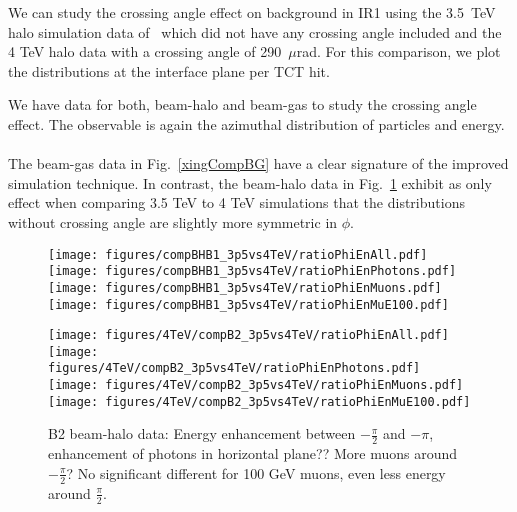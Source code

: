 We can study the crossing angle effect on background in IR1 using the 3.5~TeV halo simulation data of~\cite{nimPaperRod} which did not have any crossing angle included and the 4 TeV halo data with a crossing angle of 290~$\mu$rad. For this comparison, we plot the distributions at the interface plane per TCT hit. 

We have data for both, beam-halo and beam-gas to study the crossing angle effect. The observable is again the azimuthal distribution of particles and energy.\\

{\\} The beam-gas data in Fig.~\ref{xingCompBG} have a clear signature of the improved simulation technique. In contrast, the beam-halo data in Fig.~\ref{xingCompBH} exhibit as only effect when comparing 3.5 TeV to 4 TeV simulations that the distributions without crossing angle are slightly more symmetric in $\phi$. 

\begin{figure}
\begin{center}
  \texttt{[image: figures/compBHB1\_3p5vs4TeV/ratioPhiEnAll.pdf]}
  \texttt{[image: figures/compBHB1\_3p5vs4TeV/ratioPhiEnPhotons.pdf]}
  \texttt{[image: figures/compBHB1\_3p5vs4TeV/ratioPhiEnMuons.pdf]}
  \texttt{[image: figures/compBHB1\_3p5vs4TeV/ratioPhiEnMuE100.pdf]}

  \texttt{[image: figures/4TeV/compB2\_3p5vs4TeV/ratioPhiEnAll.pdf]}
  \texttt{[image: figures/4TeV/compB2\_3p5vs4TeV/ratioPhiEnPhotons.pdf]}
  \texttt{[image: figures/4TeV/compB2\_3p5vs4TeV/ratioPhiEnMuons.pdf]}
  \texttt{[image: figures/4TeV/compB2\_3p5vs4TeV/ratioPhiEnMuE100.pdf]}
\end{center}
\vspace{-0.6cm}
 \caption{B2 beam-halo data: Energy enhancement between $-\frac{\pi}{2}$ and $-\pi$, enhancement of photons in horizontal plane?? More muons around $-\frac{\pi}{2}$? No significant different for 100 GeV muons, even less energy around $\frac{\pi}{2}$.
  \label{xingCompBH}}
\end{figure}

